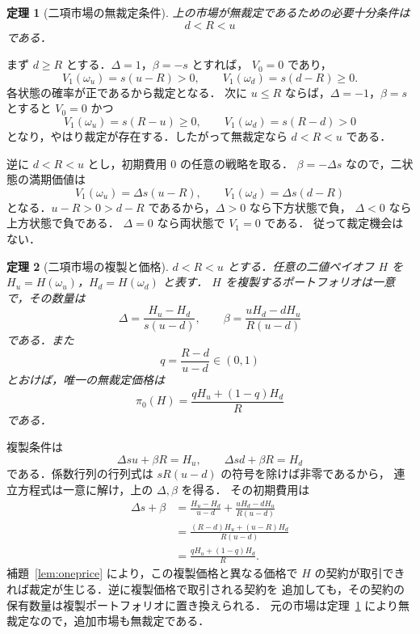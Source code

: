 \documentclass[a5paper,10pt,onecolumn]{jsarticle}
\makeatletter
\theoremstyle{mathnotetheorem}
\newtheorem{theorem}{定理}[section]
\renewcommand{\proofname}{証明}
\renewenvironment{proof}[1][\proofname]{%
  \par\pushQED{\qed}\normalfont\topsep4\p@\@plus2\p@\relax
  \trivlist\item[\hskip\labelsep\bfseries #1]\ignorespaces
}{\popQED\endtrivlist\@endpefalse}
\makeatother
\begin{document}
\begin{theorem}[二項市場の無裁定条件]\label{thm:noarb}
上の市場が無裁定であるための必要十分条件は
\[
 d<R<u
\]
である．
\end{theorem}
\begin{proof}
まず $d\ge R$ とする．$\Delta=1$，$\beta=-s$ とすれば，
$V_0=0$ であり，
\[
 V_1(\omega_u)=s(u-R)>0,\qquad
 V_1(\omega_d)=s(d-R)\ge0.
\]
各状態の確率が正であるから裁定となる．
次に $u\le R$ ならば，$\Delta=-1$，$\beta=s$ とすると
$V_0=0$ かつ
\[
 V_1(\omega_u)=s(R-u)\ge0,\qquad
 V_1(\omega_d)=s(R-d)>0
\]
となり，やはり裁定が存在する．したがって無裁定なら $d<R<u$ である．

逆に $d<R<u$ とし，初期費用 $0$ の任意の戦略を取る．
$\beta=-\Delta s$ なので，二状態の満期価値は
\[
 V_1(\omega_u)=\Delta s(u-R),\qquad
 V_1(\omega_d)=\Delta s(d-R)
\]
となる．$u-R>0>d-R$ であるから，$\Delta>0$ なら下方状態で負，
$\Delta<0$ なら上方状態で負である．
$\Delta=0$ なら両状態で $V_1=0$ である．
従って裁定機会はない．\end{proof}

\begin{theorem}[二項市場の複製と価格]\label{thm:binomial}
$d<R<u$ とする．任意の二値ペイオフ $H$ を
$H_u=H(\omega_u)$，$H_d=H(\omega_d)$ と表す．
$H$ を複製するポートフォリオは一意で，その数量は
\[
 \Delta=\frac{H_u-H_d}{s(u-d)},\qquad
 \beta=\frac{uH_d-dH_u}{R(u-d)}
\]
である．また
\[
 q=\frac{R-d}{u-d}\in(0,1)
\]
とおけば，唯一の無裁定価格は
\begin{equation}\label{eq:rnprice}
 \pi_0(H)=\frac{qH_u+(1-q)H_d}{R}
\end{equation}
である．
\end{theorem}
\begin{proof}
複製条件は
\[
 \Delta su+\beta R=H_u,\qquad
 \Delta sd+\beta R=H_d
\]
である．係数行列の行列式は $sR(u-d)$ の符号を除けば非零であるから，
連立方程式は一意に解け，上の $\Delta,\beta$ を得る．
その初期費用は
\begin{align*}
 \Delta s+\beta
 &=\frac{H_u-H_d}{u-d}
   +\frac{uH_d-dH_u}{R(u-d)}\\
 &=\frac{(R-d)H_u+(u-R)H_d}{R(u-d)}\\
 &=\frac{qH_u+(1-q)H_d}{R}.
\end{align*}
補題~\ref{lem:oneprice} により，この複製価格と異なる価格で
$H$ の契約が取引できれば裁定が生じる．逆に複製価格で取引される契約を
追加しても，その契約の保有数量は複製ポートフォリオに置き換えられる．
元の市場は定理~\ref{thm:noarb} により無裁定なので，追加市場も無裁定である．
\end{proof}
\end{document}
